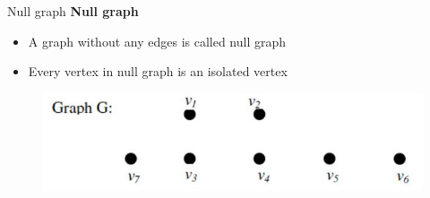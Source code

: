 \documentclass{beamer}
\begin{document}
\begin{frame}{Null graph}
	\textbf{Null graph}
	\begin{itemize}
		\item A graph without any edges is called null graph
		\item Every vertex in null graph is an isolated vertex
	\end{itemize}
\begin{figure}
	\includegraphics[scale=.4]{img/m19}
\end{figure}
\end{frame}
\end{document}
